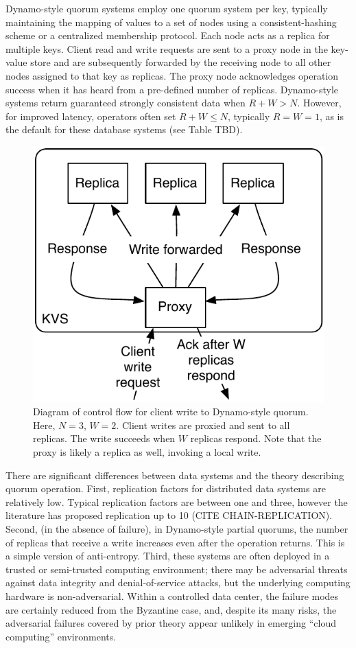 \documentclass{vldb}
\begin{document}
Dynamo-style quorum systems employ one quorum system per key,
typically maintaining the mapping of values to a set of nodes using a
consistent-hashing scheme or a centralized membership protocol. Each
node acts as a replica for multiple keys.  Client read and write
requests are sent to a proxy node in the key-value store and are
subsequently forwarded by the receiving node to all other nodes
assigned to that key as replicas.  The proxy node acknowledges
operation success when it has heard from a pre-defined number of
replicas.  Dynamo-style systems return guaranteed strongly consistent
data when $R+W > N$.  However, for improved latency, operators often
set $R+W \leq N$, typically $R=W=1$, as is the default for these
database systems (see Table TBD).

\begin{figure}
\centering
\includegraphics[width=.8\columnwidth]{figs/dynamo-quorum.pdf}
\caption{Diagram of control flow for client write to Dynamo-style
  quorum.  Here, $N=3$, $W=2$. Client writes are proxied and sent to
  all replicas. The write succeeds when $W$ replicas respond.  Note
  that the proxy is likely a replica as well, invoking a local write.}
\label{fig:dynamo-quorum}
\end{figure}

There are significant differences between data systems and the theory
describing quorum operation.  First, replication factors for
distributed data systems are relatively low.  Typical replication
factors are between one and three, however the literature has proposed
replication up to 10 (CITE CHAIN-REPLICATION).  Second, (in the
absence of failure), in Dynamo-style partial quorums, the number of
replicas that receive a write increases even after the operation
returns.  This is a simple version of anti-entropy.  Third, these
systems are often deployed in a trusted or semi-trusted computing
environment; there may be adversarial threats against data integrity
and denial-of-service attacks, but the underlying computing hardware
is non-adversarial. Within a controlled data center, the failure modes
are certainly reduced from the Byzantine case, and, despite its many
risks, the adversarial failures covered by prior theory appear
unlikely in emerging ``cloud computing'' environments.
\end{document}
